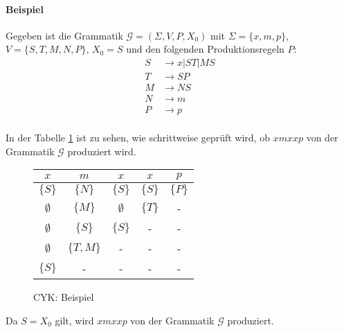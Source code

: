         \paragraph{Beispiel}
            Gegeben ist die Grammatik $ \mathcal{G} = (\Sigma, V, P, X _ 0) $ mit $ \Sigma = \{ x, m, p \} $, $ V = \{ S, T, M, N, P \} $, $ X _ 0 = S $ und den folgenden Produktionsregeln $ P $:
            \begin{equation*}
                \begin{split}
                    S & \rightarrow x | ST | MS \\
                    T & \rightarrow SP          \\
                    M & \rightarrow NS          \\
                    N & \rightarrow m           \\
                    P & \rightarrow p           \\
                \end{split}
            \end{equation*}

            In der Tabelle \ref{cyk:beispiel} ist zu sehen, wie schrittweise geprüft wird, ob $ xmxxp $ von der Grammatik $ \mathcal{G} $ produziert wird.
            \begin{figure}[ht]
                \centering
                \begin{tabular}{c | c | c | c | c}
                    $ x $         & $ m $          & $ x $         & $ x $         & $ p $     \\
                    \hline
                    $ \{ S \}   $ & $ \{ N \} $    & $ \{ S \} $   & $ \{ S \} $ & $ \{ P \} $ \\
                    $ \emptyset $ & $ \{ M \} $    & $ \emptyset $ & $ \{ T \} $ & -           \\
                    $ \emptyset $ & $ \{ S \} $    & $ \{ S \} $   & -           & -           \\
                    $ \emptyset $ & $ \{ T, M \} $ & -             & -           & -           \\
                    $ \{ S \} $   & -              & -             & -           & -           \\
                \end{tabular}
                \caption{CYK: Beispiel}
                \label{cyk:beispiel}
            \end{figure}
            Da $ S = X _ 0 $ gilt, wird $ xmxxp $ von der Grammatik $ \mathcal{G} $ produziert.


